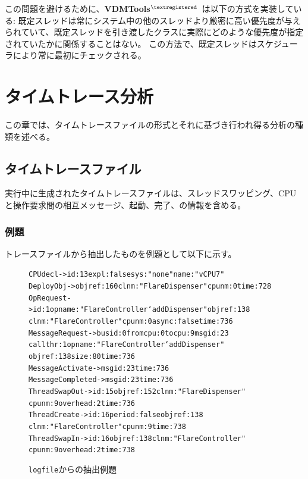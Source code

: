 \documentclass[\pformat,12pt]{jreport}
\newcommand{\vdmtools}{\textbf{VDMTools}$^{\mathbf{{\textregistered}}}$}
\begin{document}
この問題を避けるために、\vdmtools\ は以下の方式を実装している:
既定スレッドは常にシステム中の他のスレッドより厳密に高い優先度が与えられていて、既定スレッドを引き渡したクラスに実際にどのような優先度が指定されていたかに関係することはない。
この方法で、既定スレッドはスケジューラにより常に最初にチェックされる。

\chapter{タイムトレース分析}\label{chap:timetrace}

この章では、タイムトレースファイルの形式とそれに基づき行われ得る分析の種類を述べる。

\section{タイムトレースファイル}

実行中に生成されたタイムトレースファイルは、スレッドスワッピング、CPUと操作要求間の相互メッセージ、起動、完了、の情報を含める。

\subsection{例題}

トレースファイルから抽出したものを例題として以下に示す。 

\begin{figure}
{\small
\begin{alltt}
CPUdecl ->  id: 13 expl: false sys: "none" name: "vCPU 7"
DeployObj ->  objref: 160 clnm: "FlareDispenser" cpunm: 0 time: 728
OpRequest -> id: 1 opname: "FlareController`addDispenser" objref: 138 
             clnm: "FlareController" cpunm: 0 async: false time: 736
MessageRequest -> busid: 0 fromcpu: 0 tocpu: 9 msgid: 23 
                  callthr: 1 opname: "FlareController`addDispenser" 
                  objref: 138 size: 80 time: 736
MessageActivate -> msgid: 23 time: 736
MessageCompleted -> msgid: 23 time: 736
ThreadSwapOut -> id: 15 objref: 152 clnm: "FlareDispenser" 
                 cpunm: 9 overhead: 2 time: 736
ThreadCreate -> id: 16 period: false objref: 138 
                clnm: "FlareController" cpunm: 9 time: 738
ThreadSwapIn -> id: 16 objref: 138 clnm: "FlareController" 
                cpunm: 9 overhead: 2 time: 738
\end{alltt}
}
\caption{\texttt{logfile}からの抽出例題}
\end{figure}
\end{document}
